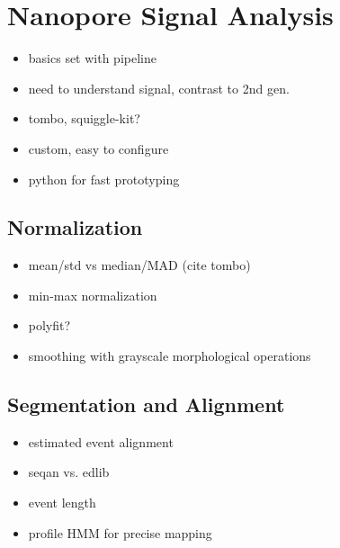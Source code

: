 \chapter{Nanopore Signal Analysis}
\label{sec:signal}

\begin{itemize}
	\item basics set with pipeline
	\item need to understand signal, contrast to 2nd gen.
	\item tombo, squiggle-kit?
	\item custom, easy to configure
	\item python for fast prototyping
\end{itemize}

\section{Normalization}
\label{sec:signal:normalization}

\begin{itemize}
	\item mean/std vs median/MAD (cite tombo)
	\item min-max normalization
	\item polyfit?
	\item smoothing with grayscale morphological operations
\end{itemize}

\section{Segmentation and Alignment}
\label{sec:signal:alignment}



\begin{itemize}
	\item estimated event alignment
	\item seqan vs. edlib
	\item event length
	\item profile HMM for precise mapping
\end{itemize}